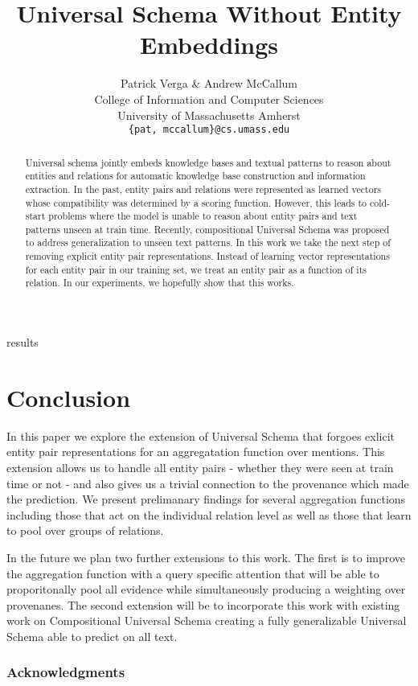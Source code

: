 \documentclass{article} %
\title{Universal Schema Without Entity Embeddings}
\author{Patrick Verga \& Andrew McCallum \\
    College of Information and Computer Sciences\\
    University of Massachusetts Amherst\\
    \texttt{\{pat, mccallum\}@cs.umass.edu} \\
}
\begin{document}
\maketitle

\begin{abstract}
Universal schema jointly embeds knowledge bases and textual patterns to reason about entities and relations for automatic knowledge base construction and information extraction. In the past, entity pairs and relations were represented as learned vectors whose compatibility was determined by a scoring function. However, this leads to cold-start problems where the model is unable to reason about entity pairs and text patterns unseen at train time. Recently, compositional Universal Schema was proposed to address generalization to unseen text patterns. In this work we take the next step of removing explicit entity pair representations. Instead of learning vector representations for each entity pair in our training set, we treat an entity pair as a function of its relation. In our experiments, we hopefully show that this works.
\end{abstract}







 {results}

\section{Conclusion}
In this paper we explore the extension of Universal Schema that forgoes exlicit entity pair representations for an aggregatation function over mentions.
This extension allows us to handle all entity pairs - whether they were seen at train time or not - and also gives us a trivial connection to the provenance which made the prediction.
We present prelimanary findings for several aggregation functions including those that act on the individual relation level as well as those that learn to pool over groups of relations.

In the future we plan two further extensions to this work.
The first is to improve the aggregation function with a query specific attention that will be able to proporitonally pool all evidence while simultaneously producing a weighting over provenanes.
The second extension will be to incorporate this work with existing work on Compositional Universal Schema creating a fully generalizable Universal Schema able to predict on all text.


\subsubsection*{Acknowledgments}




\newpage
%
\end{document}

